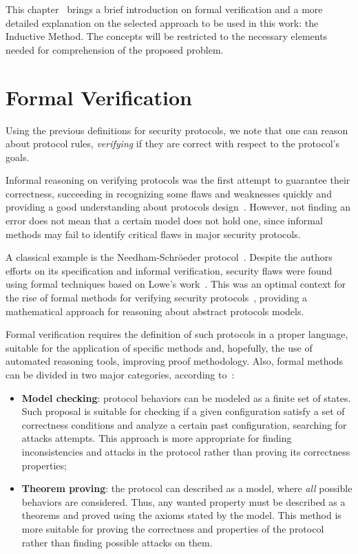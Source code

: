 This chapter~\label{chap:inductive} brings a brief introduction on formal verification and a more detailed explanation on the selected approach to be used in this work: the Inductive Method. The concepts will be restricted to the necessary elements needed for comprehension of the proposed problem.





\section{Formal Verification}
Using the previous definitions for security protocols, we note that one can reason about protocol rules, \textit{verifying} if they are correct with respect to the protocol's goals.

Informal reasoning on verifying protocols was the first attempt to guarantee their correctness, succeeding in recognizing some flaws and weaknesses quickly and providing a good understanding about protocols design~\cite{Bella2007}. However, not finding an error does not mean that a certain model does not hold one, since informal methods may fail to identify critical flaws in major security protocols.

A classical example is the Needham-Schröeder protocol~\cite{NeedhamSchroeder78}. Despite the authors efforts on its specification and informal verification, security flaws were found using formal techniques based on Lowe's work~\cite{Lowe96}. This was an optimal context for the rise of formal methods for verifying security protocols~\cite{Meadows96, Meadows94, Kemmerer94, Burrows90}, providing a mathematical approach for reasoning about abstract protocols models.

Formal verification requires the definition of such protocols in a proper language, suitable for the application of specific methods and, hopefully, the use of automated reasoning tools, improving proof methodology. Also, formal methods can be divided in two major categories, according to~\cite{BoydMathuria2008}:

\begin{itemize}
  \item \textbf{Model checking}: protocol behaviors can be modeled as a finite set of states. Such proposal is suitable for checking if a given configuration satisfy a set of correctness conditions and analyze a certain past configuration, searching for attacks attempts. This approach is more appropriate for finding inconsistencies and attacks in the protocol rather than proving its correctness properties;

  \item \textbf{Theorem proving}: the protocol can described as a model, where \textit{all} possible behaviors are considered. Thus, any wanted property must be described as a theorems and proved using the axioms stated by the model. This method is more suitable for proving the correctness and properties of the protocol rather than finding possible attacks on them.
\end{itemize}



